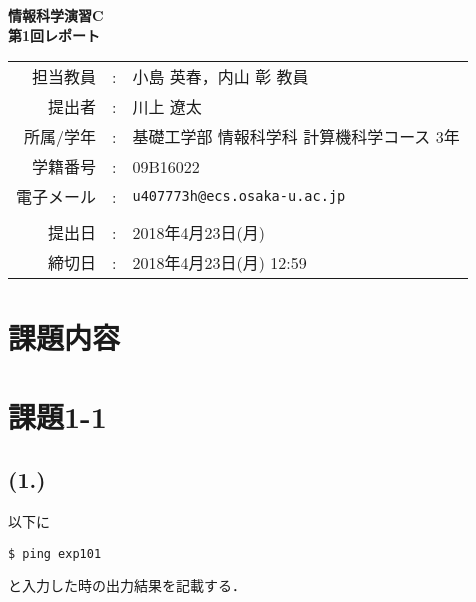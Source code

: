 \documentclass[a4j]{jarticle}
\makeatletter
\newcommand{\lectureName}{情報科学演習C}
\newcommand{\reportNumber}{1}
\newcommand{\reportTitle}{}
\newcommand{\teacherName}{小島 英春，内山 彰 教員}
\newcommand{\deadline}{2018年4月23日(月) 12:59}
\newcommand{\studentName}{川上 遼太}
\newcommand{\studentAff}{基礎工学部 情報科学科 計算機科学コース 3年}
\newcommand{\studentID}{09B16022}
\newcommand{\studentEmail}{u407773h@ecs.osaka-u.ac.jp}
\newcommand{\submitted}{2018年4月23日(月)}
\makeatother
\begin{document}
\begin{titlepage}
\mbox{\vspace{10cm}}

\begin{center}
{\Huge\bfseries
\lectureName \\
第\reportNumber{}回レポート} \\
\vspace{1cm}
{\Large \reportTitle}
\vspace{5cm}

{\large
\begin{tabular}{rcl}
担当教員 & : & \teacherName \\
提出者   & : & \studentName \\
所属/学年   & : & \studentAff\\
学籍番号 & : & \studentID \\
電子メール & : & \texttt{\studentEmail}\\
\\
提出日 & : & \submitted \\
締切日 & : & \deadline
\end{tabular}
}
\end{center}
\end{titlepage}

\tableofcontents
\newpage

\section{課題内容}


\section{課題1-1}

\subsection{(1.)}
\label{1-1-1}

以下に
\begin{verbatim}
$ ping exp101
\end{verbatim}
と入力した時の出力結果を記載する．
\end{document}
